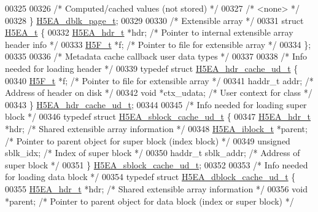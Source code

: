 \begin{DoxyCode}
00325 
00326     \textcolor{comment}{/* Computed/cached values (not stored) */}
00327     \textcolor{comment}{/* <none> */}
00328 \} \hyperlink{struct_h5_e_a__dbk__page__t}{H5EA\_dblk\_page\_t};
00329 
00330 \textcolor{comment}{/* Extensible array */}
00331 \textcolor{keyword}{struct }\hyperlink{struct_h5_e_a__t}{H5EA\_t} \{
00332     \hyperlink{struct_h5_e_a__hdr__t}{H5EA\_hdr\_t}  *hdr;           \textcolor{comment}{/* Pointer to internal extensible array header info */}
00333     \hyperlink{struct_h5_f__t}{H5F\_t}      *f;              \textcolor{comment}{/* Pointer to file for extensible array */}
00334 \};
00335 
00336 \textcolor{comment}{/* Metadata cache callback user data types */}
00337 
00338 \textcolor{comment}{/* Info needed for loading header */}
00339 \textcolor{keyword}{typedef} \textcolor{keyword}{struct }\hyperlink{struct_h5_e_a__hdr__cache__ud__t}{H5EA\_hdr\_cache\_ud\_t} \{
00340     \hyperlink{struct_h5_f__t}{H5F\_t}      *f;              \textcolor{comment}{/* Pointer to file for extensible array */}
00341     haddr\_t    addr;            \textcolor{comment}{/* Address of header on disk */}
00342     \textcolor{keywordtype}{void}       *ctx\_udata;      \textcolor{comment}{/* User context for class */}
00343 \} \hyperlink{struct_h5_e_a__hdr__cache__ud__t}{H5EA\_hdr\_cache\_ud\_t};
00344 
00345 \textcolor{comment}{/* Info needed for loading super block */}
00346 \textcolor{keyword}{typedef} \textcolor{keyword}{struct }\hyperlink{struct_h5_e_a__sblock__cache__ud__t}{H5EA\_sblock\_cache\_ud\_t} \{
00347     \hyperlink{struct_h5_e_a__hdr__t}{H5EA\_hdr\_t}    *hdr;         \textcolor{comment}{/* Shared extensible array information */}
00348     \hyperlink{struct_h5_e_a__iblock__t}{H5EA\_iblock\_t} *parent;      \textcolor{comment}{/* Pointer to parent object for super block (index block) */}
00349     \textcolor{keywordtype}{unsigned} sblk\_idx;          \textcolor{comment}{/* Index of super block */}
00350     haddr\_t sblk\_addr;          \textcolor{comment}{/* Address of super block */}
00351 \} \hyperlink{struct_h5_e_a__sblock__cache__ud__t}{H5EA\_sblock\_cache\_ud\_t};
00352 
00353 \textcolor{comment}{/* Info needed for loading data block */}
00354 \textcolor{keyword}{typedef} \textcolor{keyword}{struct }\hyperlink{struct_h5_e_a__dblock__cache__ud__t}{H5EA\_dblock\_cache\_ud\_t} \{
00355     \hyperlink{struct_h5_e_a__hdr__t}{H5EA\_hdr\_t}    *hdr;         \textcolor{comment}{/* Shared extensible array information */}
00356     \textcolor{keywordtype}{void} *parent;               \textcolor{comment}{/* Pointer to parent object for data block (index or super block) */}

\end{DoxyCode}
